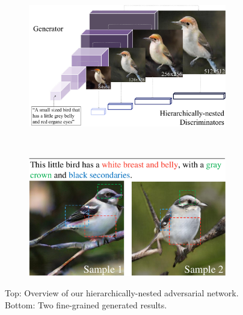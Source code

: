 \documentclass[10pt,twocolumn,letterpaper]{article}
\begin{document}
\begin{figure}[t]
	\centering
	\begin{subfigure}[t]{0.5\textwidth}
		\includegraphics[width=0.95\textwidth]{figure/intro2.pdf}
	\end{subfigure} \\
\centering
	\begin{subfigure}[t]{0.5\textwidth}
		\includegraphics[width=0.95\textwidth,height=0.55\textwidth]{figure/single_view.pdf}
	\end{subfigure}
	\vspace{-.6cm}
	\caption{Top: Overview of our hierarchically-nested adversarial network. Bottom: Two fine-grained generated results. \label{fig:intro}} 	
	\vspace{-.8cm}
\end{figure}
\end{document}
